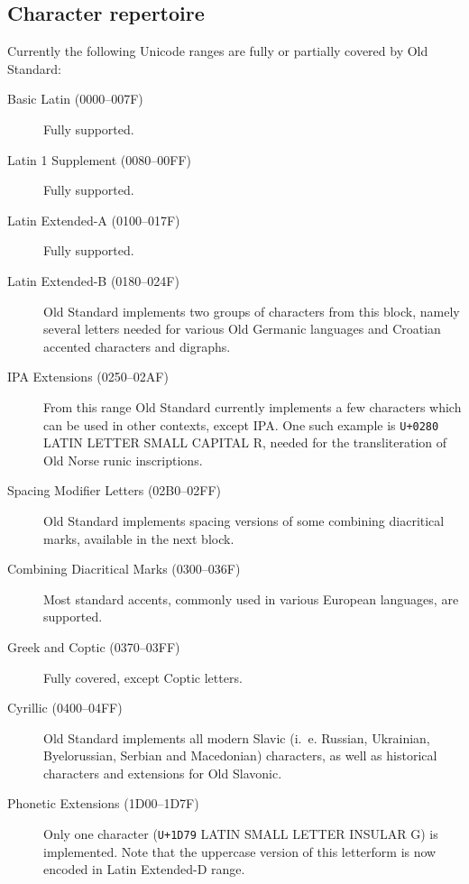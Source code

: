 \documentclass[12pt,a4paper,openany]{book}
\begin{document}
\subsection{Character repertoire}

Currently the following Unicode ranges are fully or partially covered by
Old Standard:

\begin{description}

\item[Basic Latin (0000–007F)] Fully supported.

\item[Latin 1 Supplement (0080–00FF)] Fully supported.

\item[Latin Extended-A (0100–017F)] Fully supported.

\item[Latin Extended-B (0180–024F)] Old Standard implements two groups of
characters from this block, namely several letters needed for various Old
Germanic languages and Croatian accented characters and digraphs.

\item[IPA Extensions (0250–02AF)] From this range Old Standard currently
implements a few characters which can be used in other contexts, except IPA.
One such example is \texttt{U+0280} LATIN LETTER SMALL CAPITAL R, needed for the
transliteration of Old Norse runic inscriptions.

\item[Spacing Modifier Letters (02B0–02FF)] Old Standard implements spacing
versions of some combining diacritical marks, available in the next block.

\item[Combining Diacritical Marks (0300–036F)] Most standard accents,
commonly used in various European languages, are supported.

\item[Greek and Coptic (0370–03FF)] Fully covered, except Coptic
letters.

\item[Cyrillic (0400–04FF)] Old Standard implements all modern Slavic
(i.~e. Russian, Uk\-rai\-nian, Byelorussian, Serbian and Macedonian)
characters, as well as historical characters and extensions for Old
Slavonic.

\item[Phonetic Extensions (1D00–1D7F)] Only one character (\texttt{U+1D79} LATIN
SMALL LETTER INSULAR G) is implemented. Note that the uppercase version 
of this letterform is now encoded in Latin Extended-D range.


\end{description}
\end{document}
